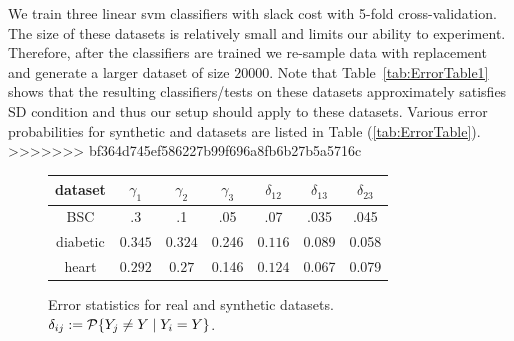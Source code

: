 We train three linear svm classifiers with slack cost with 5-fold cross-validation. The size of these datasets is relatively small and limits our ability to experiment. Therefore, after the classifiers are trained we re-sample data with replacement and generate a larger dataset of size $20000$. Note that Table~\ref{tab:ErrorTable1} shows that the resulting classifiers/tests on these datasets approximately satisfies SD condition and thus our setup should apply to these datasets. 
%
%
%
%
%
Various error probabilities for synthetic and datasets are listed in Table (\ref{tab:ErrorTable}).  
>>>>>>> bf364d745ef586227b99f696a8fb6b27b5a5716c
	\begin{figure}[!h]
		\small
		\begin{tabular}[c]{c|c|c|c|c|c|c } 
			\label{tab:ErrorTable}
			dataset & $\gamma_1$ & $\gamma_2$ & $\gamma_3$ &$\delta_{12}$ & $\delta_{13}$ & $\delta_{23}$ \\ \hline 
			BSC & .3 & .1 & .05 & .07 & .035 & .045\\  \hline
			diabetic & $0.345 $ & $ 0.324$ & 0.246 & $ 0.116 $ & 0.089 &0.058\\  \hline
			heart & $0.292$ & $0.27$ & 0.146 & $0.124$ & 0.067 & 0.079\\  \hline
		\end{tabular}
		\caption{Error statistics for real and synthetic datasets. $\delta_{ij}:=\P\{Y_j\neq Y \mid Y_i = Y\}$.}
\label{tab:error_stats}
	\end{figure}
